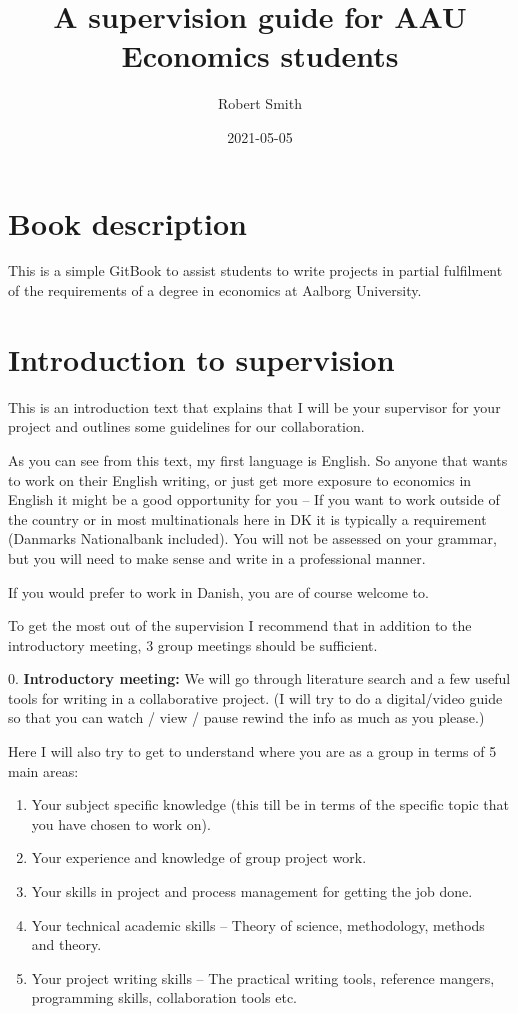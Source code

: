 \documentclass[
]{book}
\title{A supervision guide for AAU Economics students}
\author{Robert Smith}
\date{2021-05-05}
\begin{document}
\maketitle

{
\setcounter{tocdepth}{1}
\tableofcontents
}
\hypertarget{book-description}{%
\chapter{Book description}\label{book-description}}

This is a simple GitBook to assist students to write projects in partial fulfilment of the requirements of a degree in economics at Aalborg University.

\hypertarget{introduction-to-supervision}{%
\chapter{Introduction to supervision}\label{introduction-to-supervision}}

This is an introduction text that explains that I will be your
supervisor for your project and outlines some guidelines for our
collaboration.

As you can see from this text, my first language is English. So anyone
that wants to work on their English writing, or just get more exposure
to economics in English it might be a good opportunity for you -- If you
want to work outside of the country or in most multinationals here in DK
it is typically a requirement (Danmarks Nationalbank included). You will
not be assessed on your grammar, but you will need to make sense and
write in a professional manner.

If you would prefer to work in Danish, you are of course welcome to.

To get the most out of the supervision I recommend that in addition to
the introductory meeting, 3 group meetings should be sufficient.

0. \textbf{Introductory meeting:} We will go through literature search and a
few useful tools for writing in a collaborative project. (I will try to
do a digital/video guide so that you can watch / view / pause rewind the
info as much as you please.)

Here I will also try to get to understand where you are as a group in
terms of 5 main areas:

\begin{enumerate}
\def\labelenumi{\arabic{enumi}.}
\item
  Your subject specific knowledge (this till be in terms of the
  specific topic that you have chosen to work on).
\item
  Your experience and knowledge of group project work.
\item
  Your skills in project and process management for getting the job
  done.
\item
  Your technical academic skills -- Theory of science, methodology,
  methods and theory.
\item
  Your project writing skills -- The practical writing tools,
  reference mangers, programming skills, collaboration tools etc.
\end{enumerate}
\end{document}

